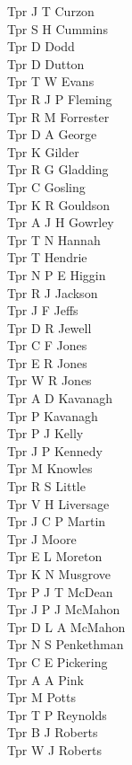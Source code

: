 \begin{multicols}{4}
  Tpr J T Curzon \\
  Tpr S H Cummins \\
  Tpr D Dodd \\
  Tpr D Dutton \\
  Tpr T W Evans \\
  Tpr R J P Fleming \\
  Tpr R M Forrester \\
  Tpr D A George \\
  Tpr K Gilder \\
  Tpr R G Gladding \\
  Tpr C Gosling \\
  Tpr K R Gouldson \\
  Tpr A J H Gowrley \\
  Tpr T N Hannah \\
  Tpr T Hendrie \\
  Tpr N P E Higgin \\
  Tpr R J Jackson \\
  Tpr J F Jeffs \\
  Tpr D R Jewell \\
  Tpr C F Jones \\
  Tpr E R Jones \\
  Tpr W R Jones \\
  Tpr A D Kavanagh \\
  Tpr P Kavanagh \\
  Tpr P J Kelly \\
  Tpr J P Kennedy \\
  Tpr M Knowles \\
  Tpr R S Little \\
  Tpr V H Liversage \\
  Tpr J C P Martin \\
  Tpr J Moore \\
  Tpr E L Moreton \\
  Tpr K N Musgrove \\
  Tpr P J T McDean \\
  Tpr J P J McMahon \\
  Tpr D L A McMahon \\
  Tpr N S Penkethman \\
  Tpr C E Pickering \\
  Tpr A A Pink \\
  Tpr M Potts \\
  Tpr T P Reynolds \\
  Tpr B J Roberts \\
  Tpr W J Roberts \\

\end{multicols}
